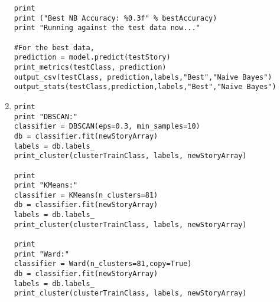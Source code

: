 \documentclass[11pt]{article}
\begin{document}
\begin{enumerate}
\begin{lstlisting}[frame=single]
print
print ("Best NB Accuracy: %0.3f" % bestAccuracy)
print "Running against the test data now..."

#For the best data,
prediction = model.predict(testStory)
print_metrics(testClass, prediction)
output_csv(testClass, prediction,labels,"Best","Naive Bayes")
output_stats(testClass,prediction,labels,"Best","Naive Bayes")
\end{lstlisting}

\item
\begin{lstlisting}[frame=single]
    print
print "DBSCAN:"
classifier = DBSCAN(eps=0.3, min_samples=10)
db = classifier.fit(newStoryArray)
labels = db.labels_
print_cluster(clusterTrainClass, labels, newStoryArray)

print
print "KMeans:"
classifier = KMeans(n_clusters=81)
db = classifier.fit(newStoryArray)
labels = db.labels_
print_cluster(clusterTrainClass, labels, newStoryArray)

print
print "Ward:"
classifier = Ward(n_clusters=81,copy=True)
db = classifier.fit(newStoryArray)
labels = db.labels_
print_cluster(clusterTrainClass, labels, newStoryArray)
\end{lstlisting}
\end{enumerate}
\end{document}
